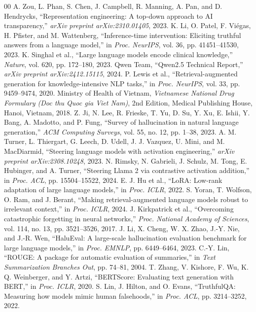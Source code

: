 \begin{thebibliography}{00}
 A. Zou, L. Phan, S. Chen, J. Campbell, R. Manning, A. Pan, and D. Hendrycks, ``Representation engineering: A top-down approach to AI transparency,'' \textit{arXiv preprint arXiv:2310.01405}, 2023.
 K. Li, O. Patel, F. Vi\'egas, H. Pfister, and M. Wattenberg, ``Inference-time intervention: Eliciting truthful answers from a language model,'' in \textit{Proc. NeurIPS}, vol. 36, pp. 41451--41530, 2023.
 K. Singhal et al., ``Large language models encode clinical knowledge,'' \textit{Nature}, vol. 620, pp. 172--180, 2023.
 Qwen Team, ``Qwen2.5 Technical Report,'' \textit{arXiv preprint arXiv:2412.15115}, 2024.
 P. Lewis et al., ``Retrieval-augmented generation for knowledge-intensive NLP tasks,'' in \textit{Proc. NeurIPS}, vol. 33, pp. 9459--9474, 2020.
 Ministry of Health of Vietnam, \textit{Vietnamese National Drug Formulary (Doc thu Quoc gia Viet Nam)}, 2nd Edition, Medical Publishing House, Hanoi, Vietnam, 2018.
 Z. Ji, N. Lee, R. Frieske, T. Yu, D. Su, Y. Xu, E. Ishii, Y. Bang, A. Madotto, and P. Fung, ``Survey of hallucination in natural language generation,'' \textit{ACM Computing Surveys}, vol. 55, no. 12, pp. 1--38, 2023.
 A. M. Turner, L. Thiergart, G. Leech, D. Udell, J. J. Vazquez, U. Mini, and M. MacDiarmid, ``Steering language models with activation engineering,'' \textit{arXiv preprint arXiv:2308.10248}, 2023.
 N. Rimsky, N. Gabrieli, J. Schulz, M. Tong, E. Hubinger, and A. Turner, ``Steering Llama 2 via contrastive activation addition,'' in \textit{Proc. ACL}, pp. 15504--15522, 2024.
 E. J. Hu et al., ``LoRA: Low-rank adaptation of large language models,'' in \textit{Proc. ICLR}, 2022.
 S. Yoran, T. Wolfson, O. Ram, and J. Berant, ``Making retrieval-augmented language models robust to irrelevant context,'' in \textit{Proc. ICLR}, 2024.
 J. Kirkpatrick et al., ``Overcoming catastrophic forgetting in neural networks,'' \textit{Proc. National Academy of Sciences}, vol. 114, no. 13, pp. 3521--3526, 2017.
 J. Li, X. Cheng, W. X. Zhao, J.-Y. Nie, and J.-R. Wen, ``HaluEval: A large-scale hallucination evaluation benchmark for large language models,'' in \textit{Proc. EMNLP}, pp. 6449--6464, 2023.
 C.-Y. Lin, ``ROUGE: A package for automatic evaluation of summaries,'' in \textit{Text Summarization Branches Out}, pp. 74--81, 2004.
 T. Zhang, V. Kishore, F. Wu, K. Q. Weinberger, and Y. Artzi, ``BERTScore: Evaluating text generation with BERT,'' in \textit{Proc. ICLR}, 2020.
 S. Lin, J. Hilton, and O. Evans, ``TruthfulQA: Measuring how models mimic human falsehoods,'' in \textit{Proc. ACL}, pp. 3214--3252, 2022.
\end{thebibliography}

